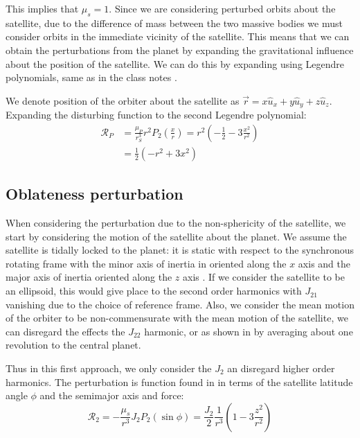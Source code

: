 This implies that $\mu_s=1$. Since we are considering perturbed orbits about the satellite, due to the difference of mass between the two massive bodies we must consider orbits in the immediate vicinity of the satellite. This means that we can obtain the perturbations from the planet by expanding the gravitational influence about the position of the satellite. We can do this by expanding using Legendre polynomials, same as in the class notes \cite{longuskiaae690}.

We denote position of the orbiter about the satellite as $\vec{r} = x \hat{u}_x + y \hat{u}_y + z \hat{u}_z$. Expanding the disturbing function to the second Legendre polynomial:
\begin{equation}
\begin{aligned}
\mathcal{R}_P &= \frac{\mu_P}{r_S^3} r^2 P_2 \left(\frac{x}{r}\right) = r^2 \left(-\frac{1}{2}-3\frac{x^2}{r^2}\right) \\
&= \frac{1}{2}(-r^2 + 3 x^2)
\end{aligned}
\end{equation}

\subsection{Oblateness perturbation}
When considering the perturbation due to the non-sphericity of the satellite, we start by considering the motion of the satellite about the planet. We assume the satellite is tidally locked to the planet: it is static with respect to the synchronous rotating frame with the minor axis of inertia in oriented along the $x$ axis and the major axis of inertia oriented along the $z$ axis \cite{paskowitz2006design}. If we consider the satellite to be an ellipsoid, this would give place to the second order harmonics with $J_{21}$ vanishing due to the choice of reference frame. Also, we consider the mean motion of the orbiter to be non-commensurate with the mean motion of the satellite, we can disregard the effects the $J_{22}$ harmonic, or as shown in \cite{paskowitz2006design} by averaging about one revolution to the central planet.

Thus in this first approach, we only consider the $J_2$ an disregard higher order harmonics. The perturbation is function found in \cite{longuskiaae690} in terms of the satellite latitude angle $\phi$ and the semimajor axis and force:
\begin{equation}
\mathcal{R}_2 = -\frac{\mu_s}{r^3} J_2 P_2\left(\sin \phi\right) = \frac{J_2}{2} \frac{1}{r^3} \left(1 - 3 \frac{z^2}{r^2}\right)
\end{equation}

